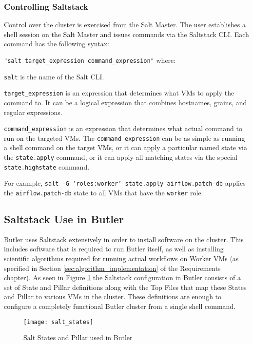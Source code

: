 \subsubsection{Controlling Saltstack}

Control over the cluster is exercised from the Salt Master. The user establishes a shell session on the Salt Master and issues commands via the Saltstack CLI. Each command has the following syntax:

\texttt{"salt target_expression command_expression"} where:

\texttt{salt} is the name of the Salt CLI.

\texttt{target_expression} is an expression that determines what VMs to apply the command to. It can be a logical expression that combines hostnames, grains, and regular expressions.

\texttt{command_expression} is an expression that determines what actual command to run on the targeted VMs. The \texttt{command_expression} can be as simple as running a shell command on the target VMs, or it can apply a particular named state via the \texttt{state.apply} command, or it can apply all matching states via the special \texttt{state.highstate} command.

For example, \texttt{salt -G 'roles:worker' state.apply airflow.patch-db} applies the \texttt{airflow.patch-db} state to all VMs that have the \texttt{worker} role.

\subsection{Saltstack Use in Butler}

Butler uses Saltstack extensively in order to install software on the cluster. This includes software that is required to run Butler itself, as well as installing scientific algorithms required for running actual workflows on Worker VMs (as specified in Section \ref{sec:algorithm_implementation} of the Requirements chapter). As seen in Figure \ref{fig:salt_states} the Saltstack configuration in Butler consists of a set of State and Pillar definitions along with the Top Files that map these States and Pillar to various VMs in the cluster. These definitions are enough to configure a completely functional Butler cluster from a single shell command.

\begin{figure}[H]
\texttt{[image: salt\_states]}
\centering
\caption {Salt States and Pillar used in Butler}
\label{fig:salt_states}
\end{figure} 

